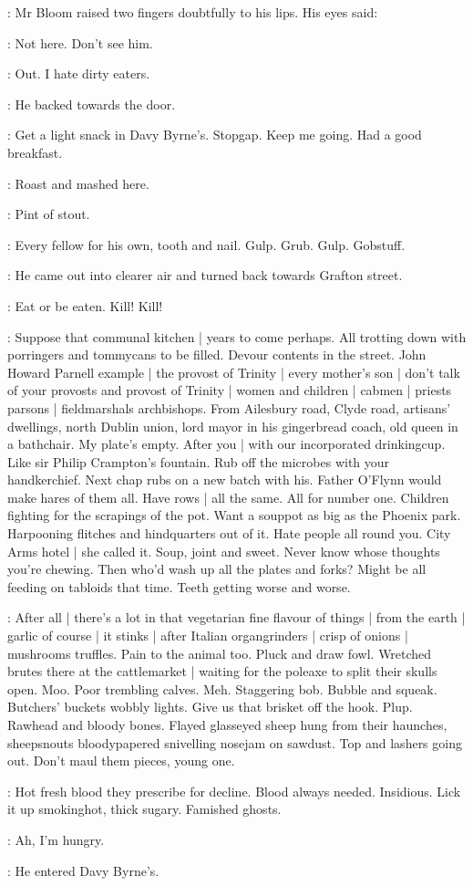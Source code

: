 :
Mr Bloom raised two fingers doubtfully to his lips.
His eyes said:

\Bloom:
Not here.
Don't see him.

\BloomInt:
Out.
I hate dirty eaters.

:
He backed towards the door.

\BloomInt:
Get a light snack in Davy Byrne's.
Stopgap.
Keep me going.
Had a good breakfast.

:
Roast and mashed here.

:
Pint of stout.

\BloomInt:
Every fellow for his own, tooth and nail.
Gulp.
Grub.
Gulp.
Gobstuff.

:
He came out into clearer air and turned back towards Grafton street.

\BloomInt:
Eat or be eaten.
Kill!
Kill!

\BloomInt:
Suppose that communal kitchen |
years to come perhaps.
All trotting down with porringers and tommycans to be filled.
Devour contents in the street.
John Howard Parnell example |
the provost of Trinity |
every mother's son |
don't talk of your provosts and provost of Trinity |
women and children |
cabmen |
priests parsons |
fieldmarshals archbishops.
From Ailesbury road,
Clyde road,
artisans' dwellings,
north Dublin union,
lord mayor in his gingerbread coach,
old queen in a bathchair.
My plate's empty.
After you |
with our incorporated drinkingcup.
Like sir Philip Crampton's fountain.
Rub off the microbes with your handkerchief.
Next chap rubs on a new batch with his.
Father O'Flynn would make hares of them all.
Have rows |
all the same.
All for number one.
Children fighting for the scrapings of the pot.
Want a souppot as big as the Phoenix park.
Harpooning flitches and hindquarters out of it.
Hate people all round you.
City Arms hotel |
 she called it.
Soup, joint and sweet.
Never know whose thoughts you're chewing.
Then who'd wash up all the plates and forks?
Might be all feeding on tabloids that time.
Teeth getting worse and worse.

\BloomInt:
After all |
there's a lot in that vegetarian fine flavour of things |
from the earth |
garlic of course |
it stinks |
after Italian organgrinders |
crisp of onions |
mushrooms truffles.
Pain to the animal too.
Pluck and draw fowl.
Wretched brutes there at the cattlemarket |
waiting for the poleaxe to split their skulls open.
Moo.
Poor trembling calves.
Meh.
Staggering bob.
Bubble and squeak.
Butchers' buckets wobbly lights.
Give us that brisket off the hook.
Plup.
Rawhead and bloody bones.
Flayed glasseyed sheep hung from their haunches,
sheepsnouts bloodypapered snivelling nosejam on sawdust.
Top and lashers going out.
Don't maul them pieces, young one.

\BloomInt:
Hot fresh blood they prescribe for decline.
Blood always needed.
Insidious.
Lick it up smokinghot, thick sugary.
Famished ghosts.

\BloomInt:
Ah, I'm hungry.

:
He entered Davy Byrne's.
